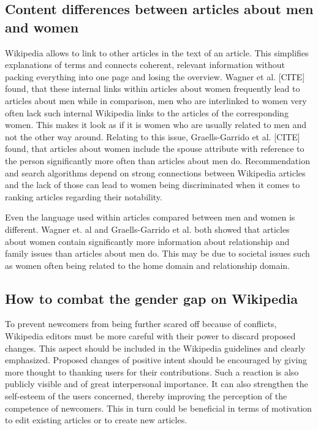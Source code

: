 \documentclass[a4paper, 11pt]{article}
\begin{document}
\subsection{Content differences between articles about men and women} \label{sec:gender-gap-wikipedia:contentdiff}
Wikipedia allows to link to other articles in the text of an article. This simplifies explanations of terms and connects coherent, relevant information without packing everything into one page and losing the overview. Wagner et al. [CITE] found, that these internal links within articles about women frequently lead to articles about men while in comparison, men who are interlinked to women very often lack such internal Wikipedia links to the articles of the corresponding women. This makes it look as if it is women who are usually related to men and not the other way around. Relating to this issue, Graells-Garrido et al. [CITE] found, that articles about women include the spouse attribute with reference to the person significantly more often than articles about men do. Recommendation and search algorithms depend on strong connections between Wikipedia articles and the lack of those can lead to women being discriminated when it comes to ranking articles regarding their notability.

Even the language used within articles compared between men and women is different. Wagner et. al and Graells-Garrido et al. both showed that articles about women contain significantly more information about relationship and family issues than articles about men do. This may be due to societal issues such as women often being related to the home domain and relationship domain.

\subsection{How to combat the gender gap on Wikipedia} \label{sec:gender-gap-wikipedia:combatgap}
To prevent newcomers from being further scared off because of conflicts, Wikipedia editors must be more careful with their power to discard proposed changes. This aspect should be included in the Wikipedia guidelines and clearly emphasized. Proposed changes of positive intent should be encouraged by giving more thought to thanking users for their contributions. Such a reaction is also publicly visible and of great interpersonal importance. It can also strengthen the self-esteem of the users concerned, thereby improving the perception of the competence of newcomers. This in turn could be beneficial in terms of motivation to edit existing articles or to create new articles.
\end{document}
